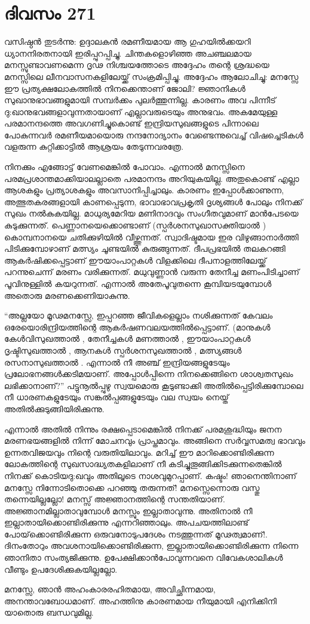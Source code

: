 \section{ദിവസം 271}


വസിഷ്ഠന്‍ തുടര്‍ന്നു: ഉദ്ദാലകന്‍ രമണീയമായ ആ ഗുഹയില്‍ക്കയറി ധ്യാനനിരതനായി ഇരിപ്പുറപ്പിച്ചു. ചിന്തകളൊഴിഞ്ഞ അചഞ്ചലമായ മനസ്സുണ്ടാവണമെന്ന ദൃഢ നിശ്ചയത്തോടെ അദ്ദേഹം തന്റെ ശ്രദ്ധയെ മനസ്സിലെ ലീനവാസനകളിലേയ്ക്ക് സംക്രമിപ്പിച്ചു. അദ്ദേഹം ആലോചിച്ചു: മനസ്സേ ഈ പ്രത്യക്ഷലോകത്തില്‍ നിനക്കെന്താണ് ജോലി? ജ്ഞാനികള്‍ സുഖാനുഭാവങ്ങളുമായി സമ്പര്‍ക്കം പുലര്‍ത്തുന്നില്ല. കാരണം അവ പിന്നീട് ദു:ഖാനുഭവങ്ങളാവുന്നതായാണ് എല്ലാവരുടെയും അനുഭവം. അകമേയുള്ള പരമാനന്ദത്തെ അവഗണിച്ചുകൊണ്ട് ഇന്ദ്രിയസുഖങ്ങളുടെ പിന്നാലെ പോകുന്നവര്‍ രമണീയമായൊരു നന്ദനോദ്യാനം വേണ്ടെന്നുവെച്ച് വിഷച്ചെടികള്‍ വളരുന്ന കുറ്റിക്കാട്ടില്‍ ആശ്രയം തേടുന്നവരത്രേ.  

നിനക്കും  എങ്ങോട്ട് വേണമെങ്കില്‍ പോവാം. എന്നാല്‍ മനസ്സിനെ പരമപ്രശാന്തമാക്കിയാലല്ലാതെ പരമാനന്ദം അറിയുകയില്ല. അതുകൊണ്ട് എല്ലാ ആശകളും പ്രത്യാശകളും അവസാനിപ്പിച്ചാലും. കാരണം ഇപ്പോള്‍ക്കാണുന്ന, അത്ഭുതകരങ്ങളായി കാണപ്പെടുന്ന, ഭാവാഭാവപ്രകൃതി ദൃശ്യങ്ങള്‍ പോലും നിനക്ക് സുഖം നല്‍കുകയില്ല. മാധുര്യമേറിയ മണിനാദവും സംഗീതവുമാണ് മാന്‍പേടയെ കുടുക്കുന്നത്. പെണ്ണാനയെക്കൊണ്ടാണ് (സ്പര്‍ശനസുഖാസക്തിയാല്‍ ) കൊമ്പനാനയെ ചതിക്കുഴിയില്‍ വീഴ്ത്തുന്നത്. സ്വാദിഷ്ടമായ ഇര വിഴുങ്ങാനാര്‍ത്തി പിടിക്കുമ്പോഴാണ് മത്സ്യം ചൂണ്ടയില്‍ കുരുങ്ങുന്നത്. ദീപപ്രഭയില്‍ തലകറങ്ങി ആകര്‍ഷിക്കപ്പെട്ടാണ് ഈയാംപാറ്റകള്‍ വിളക്കിലെ ദീപനാളത്തിലേയ്ക്ക് പറന്നുചെന്ന് മരണം വരിക്കുന്നത്. മധുവുണ്ണാന്‍ വരുന്ന തേനീച്ച മണംപിടിച്ചാണ് പൂവിനുള്ളില്‍ കയറുന്നത്. എന്നാല്‍ അതേപൂവുതന്നെ കൂമ്പിയടയുമ്പോള്‍ അതൊരു മരണക്കെണിയാകുന്നു.      

“അല്ലയോ മൂഢമനസ്സേ, ഇപ്പറഞ്ഞ ജീവികളെല്ലാം നശിക്കുന്നത് കേവലം ഒരേയൊരിന്ദ്രിയത്തിന്റെ ആകര്‍ഷണവലയത്തില്‍പ്പെട്ടാണ്. (മാനുകള്‍  കേള്‍വിസുഖത്താല്‍ , തേനീച്ചകള്‍ മണത്താല്‍ , ഈയാംപാറ്റകള്‍  ദൃഷ്ടിസുഖത്താല്‍ , ആനകള്‍ സ്പര്‍ശനസുഖത്താല്‍ , മത്സ്യങ്ങള്‍ രസനാസുഖത്താല്‍ . എന്നാല്‍ നീ അഞ്ച് ഇന്ദ്രിയങ്ങളുടേയും പ്രലോഭനങ്ങള്‍ക്കടിമയാണ്. അപ്പോള്‍പ്പിന്നെ നിനക്കെങ്ങിനെ ശാശ്വതസുഖം ലഭിക്കാനാണ്?” പട്ടുനൂല്‍പ്പുഴു സ്വയമൊരു കൂടുണ്ടാക്കി അതില്‍പ്പെട്ടിരിക്കുമ്പോലെ നീ ധാരണകളുടേയും സങ്കല്‍പ്പങ്ങളുടേയും വല സ്വയം നെയ്ത് അതില്‍ക്കുടുങ്ങിയിരിക്കുന്നു. 

എന്നാല്‍ അതില്‍ നിന്നും രക്ഷപ്പെടാമെങ്കില്‍ നിനക്ക് പരമശുദ്ധിയും ജനന മരണഭയങ്ങളില്‍ നിന്ന് മോചനവും പ്രാപ്തമാവും. അങ്ങിനെ സര്‍വ്വസമത്വ ഭാവവും ഉന്നതവിജയവും നിന്റെ വരുതിയിലാവും. മറിച്ച് ഈ മാറിക്കൊണ്ടിരിക്കുന്ന ലോകത്തിന്റെ സുഖസാദ്ധ്യതകളിലാണ് നീ കടിച്ചുതൂങ്ങിക്കിടക്കുന്നതെങ്കില്‍ നിനക്ക് കൊടിയദു:ഖവും അതിലൂടെ നാശവുമുറപ്പാണ്.
കഷ്ടം! ഞാനെന്തിനാണ് മനസ്സേ നിന്നോടിതൊക്കെ പറഞ്ഞു തരുന്നത്! മനസ്സെന്നൊരു വസ്തു തന്നെയില്ലല്ലോ! മനസ്സ് അജ്ഞാനത്തിന്റെ സന്തതിയാണ്. അജ്ഞാനമില്ലാതാവുമ്പോള്‍ മനസ്സും ഇല്ലാതാവുന്നു. അതിനാല്‍ നീ ഇല്ലാതായിക്കൊണ്ടിരിക്കുന്നു എന്നറിഞ്ഞാലും. അപചയത്തിലാണ്ട് പോയ്‌ക്കൊണ്ടിരിക്കുന്ന ഒരുവനോടുപദേശം നടത്തുന്നത് മൂഢത്വമാണ്!. ദിനംതോറും അവശനായിക്കൊണ്ടിരിക്കുന്ന, ഇല്ലാതായിക്കൊണ്ടിരിക്കുന്ന  നിന്നെ ഞാനിതാ സംത്യജിക്കുന്നു. ഉപേക്ഷിക്കാന്‍പോവുന്നവനെ വിവേകശാലികള്‍ വീണ്ടും ഉപദേശിക്കുകയില്ലല്ലോ.

മനസ്സേ, ഞാന്‍ അഹംകാരരഹിതമായ, അവിച്ഛിന്നമായ, അനന്താവബോധമാണ്. അഹത്തിനു കാരണമായ നീയുമായി എനിക്കിനി യാതൊരു ബന്ധവുമില്ല.